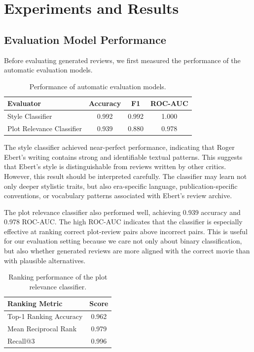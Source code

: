 \section{Experiments and Results}

\subsection{Evaluation Model Performance}

Before evaluating generated reviews, we first measured the performance of the automatic evaluation models.

\begin{table}[h]
\centering
\begin{tabular}{l c c c}
\hline
\textbf{Evaluator} & \textbf{Accuracy} & \textbf{F1} & \textbf{ROC-AUC} \\
\hline
Style Classifier & 0.992 & 0.992 & 1.000 \\
Plot Relevance Classifier & 0.939 & 0.880 & 0.978 \\
\hline
\end{tabular}
\caption{Performance of automatic evaluation models.}
\label{tab:evaluators}
\end{table}

The style classifier achieved near-perfect performance, indicating that Roger Ebert's writing contains strong and identifiable textual patterns. This suggests that Ebert's style is distinguishable from reviews written by other critics. However, this result should be interpreted carefully. The classifier may learn not only deeper stylistic traits, but also era-specific language, publication-specific conventions, or vocabulary patterns associated with Ebert's review archive.

The plot relevance classifier also performed well, achieving 0.939 accuracy and 0.978 ROC-AUC. The high ROC-AUC indicates that the classifier is especially effective at ranking correct plot-review pairs above incorrect pairs. This is useful for our evaluation setting because we care not only about binary classification, but also whether generated reviews are more aligned with the correct movie than with plausible alternatives.

\begin{table}[h]
\centering
\begin{tabular}{l c}
\hline
\textbf{Ranking Metric} & \textbf{Score} \\
\hline
Top-1 Ranking Accuracy & 0.962 \\
Mean Reciprocal Rank & 0.979 \\
Recall@3 & 0.996 \\
\hline
\end{tabular}
\caption{Ranking performance of the plot relevance classifier.}
\label{tab:ranking}
\end{table}

